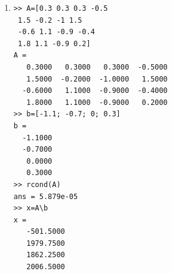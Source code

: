 \begin{exercise}
\begin{enumerate}
\item 
\begin{verbatim}
>> A=[0.3 0.3 0.3 -0.5
 1.5 -0.2 -1 1.5
 -0.6 1.1 -0.9 -0.4
 1.8 1.1 -0.9 0.2]
A =
   0.3000   0.3000   0.3000  -0.5000
   1.5000  -0.2000  -1.0000   1.5000
  -0.6000   1.1000  -0.9000  -0.4000
   1.8000   1.1000  -0.9000   0.2000
>> b=[-1.1; -0.7; 0; 0.3]
b =
  -1.1000
  -0.7000
   0.0000
   0.3000
>> rcond(A)
ans = 5.879e-05
>> x=A\b
x =
   -501.5000
   1979.7500
   1862.2500
   2006.5000
\end{verbatim}

\end{enumerate}
\end{exercise}







